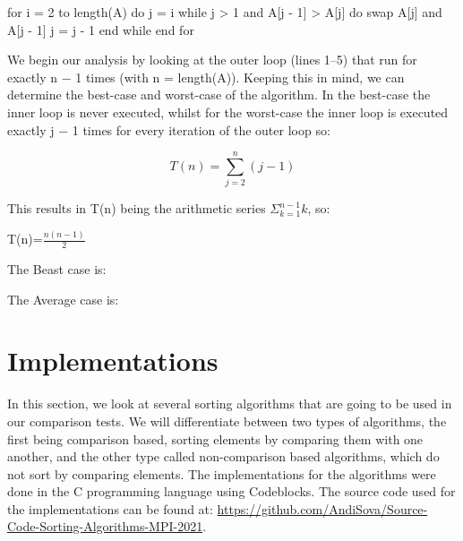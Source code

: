 \documentclass{article}
\numberwithin{figure}{section}
\newenvironment{metaverbatim}{\verbatim}{\endverbatim}
\begin{document}
\begin{metaverbatim}
for i = 2 to length(A) do
        j = i
        while j > 1 and A[j - 1] > A[j] do
                swap A[j] and A[j - 1]
                j = j - 1
        end while
end for 
\end{metaverbatim}

We begin our analysis by looking at the outer loop (lines 1–5) that run for exactly n − 1 times (with n = length(A)). Keeping this in mind, we can determine the best-case and worst-case of the algorithm. In the best-case the inner loop is never executed, whilst for the worst-case the inner loop is executed exactly j − 1 times for every iteration of the outer loop so:

\[ T(n)=\sum_{j=2}^{n} (j-1) \]

This results in T(n) being the arithmetic series \({\Sigma_{k=1}^{n-1}k}\), so:\\
\centerline{T(n)=\(\frac{n(n-1)}{2}\)}

\vspace{5mm} %

\centerline{}

\vspace{5mm} %

The Beast case is: \\

\centerline{}

\vspace{5mm} %

The Average case is: \\

\centerline{}


\section{Implementations}

In this section, we look at several sorting algorithms that are going to be used in our comparison tests. We will differentiate between two types of algorithms, the first being comparison based, sorting elements by comparing them with one another, and the other type called non-comparison based algorithms, which do not sort by comparing elements. The implementations for the algorithms were done in the C programming language using Codeblocks. The source code used for the implementations can be found at: \url{https://github.com/AndiSova/Source-Code-Sorting-Algorithms-MPI-2021}.
\end{document}
